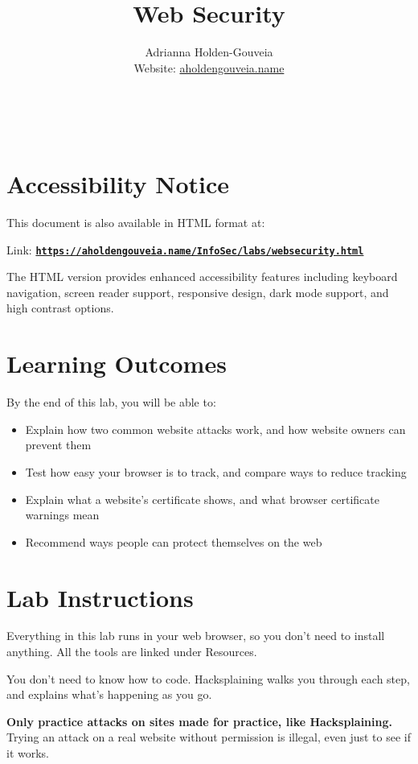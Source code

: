 \documentclass[12pt]{article}
\title{Web Security}
\author{
        Adrianna Holden-Gouveia \\
        Website: \href{https://aholdengouveia.name}{aholdengouveia.name}\\ 
        \date{\vspace{-5ex}}
        \faGithub {: aholdengouveia} \\
        \faTwitter {: aholdengouveia} \\
        }
\begin{document}
    

\maketitle

\section*{Accessibility Notice}
This document is also available in HTML format at:

Link: \href{https://aholdengouveia.name/InfoSec/labs/websecurity.html}{\textbf{\nolinkurl{https://aholdengouveia.name/InfoSec/labs/websecurity.html}}}

The HTML version provides enhanced accessibility features including keyboard navigation, screen reader support, responsive design, dark mode support, and high contrast options.



\section*{Learning Outcomes}
By the end of this lab, you will be able to:
\begin{itemize}
    \item Explain how two common website attacks work, and how website owners can prevent them
    \item Test how easy your browser is to track, and compare ways to reduce tracking
    \item Explain what a website's certificate shows, and what browser certificate warnings mean
    \item Recommend ways people can protect themselves on the web
\end{itemize}

\section*{Lab Instructions}
Everything in this lab runs in your web browser, so you don't need to install anything. All the tools are linked under Resources.

You don't need to know how to code. Hacksplaining walks you through each step, and explains what's happening as you go.

\textbf{Only practice attacks on sites made for practice, like Hacksplaining.} Trying an attack on a real website without permission is illegal, even just to see if it works.
\end{document}
